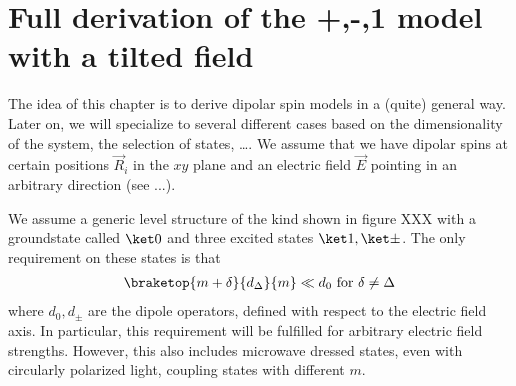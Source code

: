 \section{Full derivation of the +,-,1 model with a tilted field}

The idea of this chapter is to derive dipolar spin models in a (quite) general way. Later on, we will specialize to several different cases based on the dimensionality of the system, the selection of states, \ldots. We assume that we have dipolar spins at certain positions $\vec{R}_i$ in the $xy$ plane and an electric field $\vec{E}$ pointing in an arbitrary direction (see ...).

We assume a generic level structure of the kind shown in figure XXX with a groundstate called $\ketz$ and three excited states $\keto, \ketpm$. The only requirement on these states is that
\begin{align}
    \braketop{m+\delta}{d_\Delta}{m} \ll d_0 \text{ for } \delta \ne \Delta
\end{align}
where $d_0, d_\pm$ are the dipole operators, defined with respect to the electric field axis.
In particular, this requirement will be fulfilled for arbitrary electric field strengths. However, this also includes microwave dressed states, even with circularly polarized light, coupling states with different $m$.

